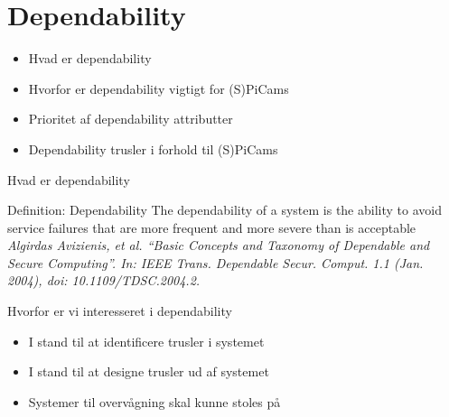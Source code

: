 
\section{Dependability}

\begin{frame}[fragile]{\insertsection}{}
  \begin{itemize}
    \item Hvad er dependability
    \item Hvorfor er dependability vigtigt for (S)PiCams
    \item Prioritet af dependability attributter
    \item Dependability trusler i forhold til (S)PiCams
  \end{itemize}
\end{frame}

\begin{frame}[fragile]{\insertsection}{Hvad er dependability}
  \begin{block}{Definition: Dependability}
    The dependability of a system is the ability to avoid service failures that are more frequent and more severe than is acceptable \\

    \emph{\tiny{Algirdas Avizienis, et al. “Basic Concepts and Taxonomy of Dependable and Secure Computing”. In: IEEE Trans. Dependable Secur. Comput. 1.1 (Jan. 2004), doi: 10.1109/TDSC.2004.2.}}
  \end{block}
\end{frame}


\begin{frame}[fragile]{\insertsection}{Hvorfor er vi interesseret i dependability}
  \begin{itemize}
    \item I stand til at identificere trusler i systemet
    \item I stand til at designe trusler ud af systemet
    \item Systemer til overvågning skal kunne stoles på
  \end{itemize}
\end{frame}


